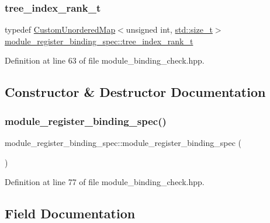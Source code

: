 \subsubsection{\texorpdfstring{tree\+\_\+index\+\_\+rank\+\_\+t}{tree\_index\_rank\_t}}
{\footnotesize\ttfamily typedef \hyperlink{custom__map_8hpp_ad1ed68f2ff093683ab1a33522b144adc}{Custom\+Unordered\+Map}$<$unsigned int, \hyperlink{tutorial__pact__2019_2Introduction_2sixth_2test_8c_a7c94ea6f8948649f8d181ae55911eeaf}{std\+::size\+\_\+t}$>$ \hyperlink{classmodule__register__binding__spec_a151eec9e0ca85fdf97be1090bf8d46ad}{module\+\_\+register\+\_\+binding\+\_\+spec\+::tree\+\_\+index\+\_\+rank\+\_\+t}\hspace{0.3cm}{\ttfamily [private]}}



Definition at line 63 of file module\+\_\+binding\+\_\+check.\+hpp.



\subsection{Constructor \& Destructor Documentation}
\mbox{\label{classmodule__register__binding__spec_a506bc1bf96f01a60704444cae575adf8}} 
\subsubsection{\texorpdfstring{module\+\_\+register\+\_\+binding\+\_\+spec()}{module\_register\_binding\_spec()}}
{\footnotesize\ttfamily module\+\_\+register\+\_\+binding\+\_\+spec\+::module\+\_\+register\+\_\+binding\+\_\+spec (\begin{DoxyParamCaption}{ }\end{DoxyParamCaption})\hspace{0.3cm}{\ttfamily [inline]}}



Definition at line 77 of file module\+\_\+binding\+\_\+check.\+hpp.



\subsection{Field Documentation}
\mbox{\label{classmodule__register__binding__spec_a56a940aea2a81fb2095dac64d1c6c510}} 
